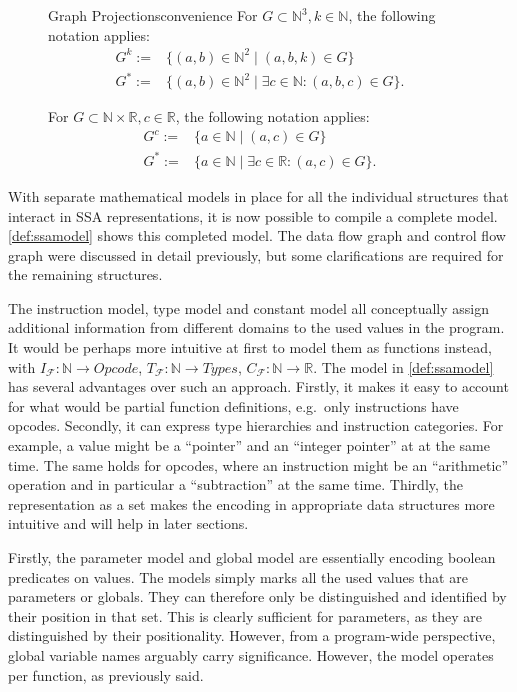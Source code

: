 \begin{figure}[p]
\begin{notation}{Graph Projections}{convenience}
    For $G\subset\mathbb N^3, k\in\mathbb N$, the following notation applies:
    \begin{align*}
        G^k:=&\{(a,b)\in\mathbb N^2\mid (a,b,k)\in G\}\\
        G^*:=&\{(a,b)\in\mathbb N^2\mid \exists c\in\mathbb N:(a,b,c)\in G\}.
    \end{align*}

    For $G\subset\mathbb N\times\mathbb R, c\in\mathbb R$, the following
    notation applies:
    \begin{align*}
        G^c:=&\{a\in\mathbb N\mid (a,c)\in G\}\\
        G^*:=&\{a\in\mathbb N\mid \exists c\in\mathbb R:(a,c)\in G\}.
    \end{align*}
\end{notation}
\end{figure}

    With separate mathematical models in place for all the individual structures
    that interact in SSA representations, it is now possible to compile a
    complete model.
    \autoref{def:ssamodel} shows this completed model.
    The data flow graph and control flow graph were discussed in detail
    previously, but some clarifications are required for the remaining
    structures.

    The instruction model, type model and constant model all conceptually assign
    additional information from different domains to the used values in the
    program.
    It would be perhaps more intuitive at first to model them as functions
    instead, with $I_\mathcal F\colon\mathbb N\rightarrow Opcode$,
    $T_\mathcal F\colon\mathbb N\rightarrow Types$,
    $C_\mathcal F\colon\mathbb N\rightarrow \mathbb R$.
    The model in \autoref{def:ssamodel} has several advantages over such an
    approach.
    Firstly, it makes it easy to account for what would be partial function
    definitions, e.g.\ only instructions have opcodes.
    Secondly, it can express type hierarchies and instruction categories.
    For example, a value might be a ``pointer'' and an ``integer pointer'' at
    at the same time.
    The same holds for opcodes, where an instruction might be an ``arithmetic''
    operation and in particular a ``subtraction'' at the same time.
    Thirdly, the representation as a set makes the encoding in appropriate data
    structures more intuitive and will help in later sections.

    Firstly, the parameter model and global model are essentially encoding
    boolean predicates on values.
    The models simply marks all the used values that are parameters or globals.
    They can therefore only be distinguished and identified by their position
    in that set.
    This is clearly sufficient for parameters, as they are distinguished by
    their positionality.
    However, from a program-wide perspective, global variable names arguably
    carry significance.
    However, the model operates per function, as previously said.

